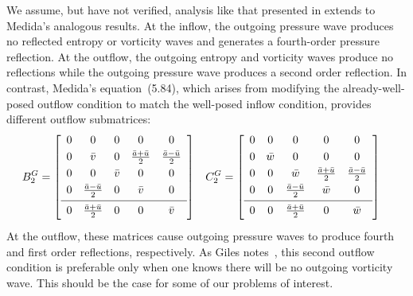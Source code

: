 %
We assume, but have not verified, analysis like that presented in
\citet[\textsection{}3.7.4]{Giles1988Nonreflecting} extends to Medida's
analogous results.  At the inflow, the outgoing pressure wave produces no
reflected entropy or vorticity waves and generates a fourth-order pressure
reflection.  At the outflow, the outgoing entropy and vorticity waves produce
no reflections while the outgoing pressure wave produces a second order
reflection.  In contrast, Medida's equation~(5.84), which arises from modifying
the already-well-posed outflow condition to match the well-posed inflow
condition, provides different outflow submatrices:
\begin{align}
\label{eq:dimeulerapproxmedidaopt2}
  B^G_2 &= \left[\begin{array}{ccccc}
    0 & 0                         & 0       & 0                           & 0                         \\ \noalign{\smallskip}
    0 & \bar{v}                   & 0       & \frac{\bar{a} + \bar{u}}{2} & \frac{\bar{a}-\bar{u}}{2} \\ \noalign{\smallskip}
    0 & 0                         & \bar{v} & 0                           & 0                         \\ \noalign{\smallskip}
    0 & \frac{\bar{a}-\bar{u}}{2} & 0       & \bar{v}                     & 0                         \\ \noalign{\smallskip} \hline \noalign{\smallskip}
    0 & \frac{\bar{a}+\bar{u}}{2} & 0       & 0                           & \bar{v}                   \\ \noalign{\smallskip}
  \end{array}\right]
&
  C^G_2 &= \left[\begin{array}{ccccc}
    0 & 0       & 0                         & 0                         & 0                         \\ \noalign{\smallskip}
    0 & \bar{w} & 0                         & 0                         & 0                         \\ \noalign{\smallskip}
    0 & 0       & \bar{w}                   & \frac{\bar{a}+\bar{u}}{2} & \frac{\bar{a}-\bar{u}}{2} \\ \noalign{\smallskip}
    0 & 0       & \frac{\bar{a}-\bar{u}}{2} & \bar{w}                   & 0                         \\ \noalign{\smallskip} \hline \noalign{\smallskip}
    0 & 0       & \frac{\bar{a}+\bar{u}}{2} & 0                         & \bar{w}                   \\ \noalign{\smallskip}
  \end{array}\right]
\end{align}
At the outflow, these matrices cause outgoing pressure waves to produce fourth
and first order reflections, respectively.  As Giles
notes~\citep{Giles1990Nonreflecting}, this second outflow condition is
preferable only when one knows there will be no outgoing vorticity wave.  This
should be the case for some of our problems of interest.


